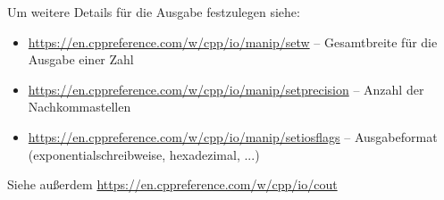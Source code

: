 \begin{plusbox}[]
Um weitere Details für die Ausgabe festzulegen siehe:
\begin{itemize}
\item \url{https://en.cppreference.com/w/cpp/io/manip/setw} -- Gesamtbreite für die Ausgabe einer Zahl
\item \url{https://en.cppreference.com/w/cpp/io/manip/setprecision} -- Anzahl der Nachkommastellen
\item \url{https://en.cppreference.com/w/cpp/io/manip/setiosflags} -- Ausgabeformat (exponentialschreibweise, hexadezimal, ...)
\end{itemize}
Siehe außerdem \url{https://en.cppreference.com/w/cpp/io/cout}
\end{plusbox}

